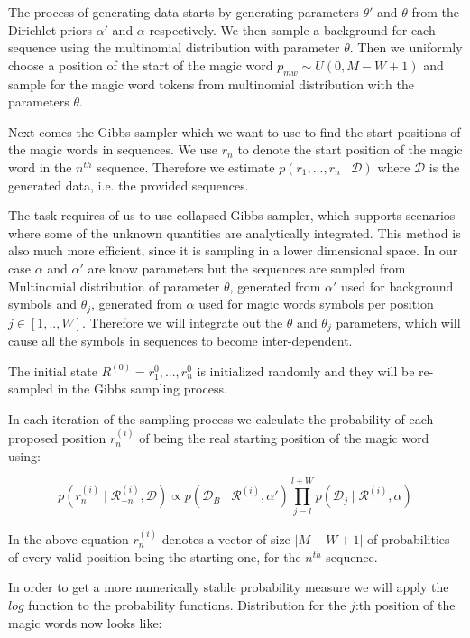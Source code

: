 \documentclass[]{article}
\begin{document}
	The process of generating data starts by generating parameters $\theta'$ and $\theta$ from the Dirichlet priors $\alpha'$ and $\alpha$ respectively. We then sample a background for each sequence using the multinomial distribution with parameter $\theta$. Then we uniformly choose a position of the start of the magic word $p_{mw} \sim U(0, M-W+1)$ and sample for the magic word tokens from multinomial distribution with the parameters $\theta$. 
	
	Next comes the Gibbs sampler which we want to use to find the start positions of the magic words in sequences. We use $r_n$ to denote the start position of the magic word in the $n^{th}$ sequence. Therefore we estimate $p(r_1,...,r_n \mid \mathcal{D})$ where $\mathcal{D}$ is the generated data, i.e. the provided sequences.
	
	The task requires of us to use collapsed Gibbs sampler, which supports scenarios where some of the unknown quantities are analytically integrated. This method is also much more efficient, since it is sampling in a lower dimensional space. In our case $\alpha$ and $\alpha'$ are know parameters but the sequences are sampled from Multinomial distribution of parameter $\theta$, generated from $\alpha'$ used for background symbols and $\theta_j$, generated from $\alpha$ used for magic words symbols per position $j \in [1,..,W]$. Therefore we will integrate out the $\theta$ and $\theta_j$ parameters, which will cause all the symbols in sequences to become inter-dependent.
	
	The initial state $R^{(0)} = r_1^0, ..., r_n^0$ is initialized randomly  and they will be re-sampled in the Gibbs sampling process. 
	
	In each iteration of the sampling process we calculate the probability of each proposed position $r_n^{(i)}$ of being the real starting position of the magic word using:
	
	$$ p(r_n^{(i)} \mid \mathcal{R}_{-n}^{(i)}, \mathcal{D}) \propto p(\mathcal{D}_{B} \mid \mathcal{R}^{(i)}, \alpha') \prod_{j=l}^{l+W} p(\mathcal{D}_j \mid \mathcal{R}^{(i)}, \alpha)$$ 
	
	In the above equation $r_n^{(i)}$ denotes a vector of size $| M-W+1 |$ of probabilities of every valid position being the starting one, for the $n^{th}$ sequence. 
	
	
	In order to get a more numerically stable probability measure we will apply the $log$ function to the probability functions. Distribution for the $j$:th position of the magic words now looks like:
	
\end{document}
